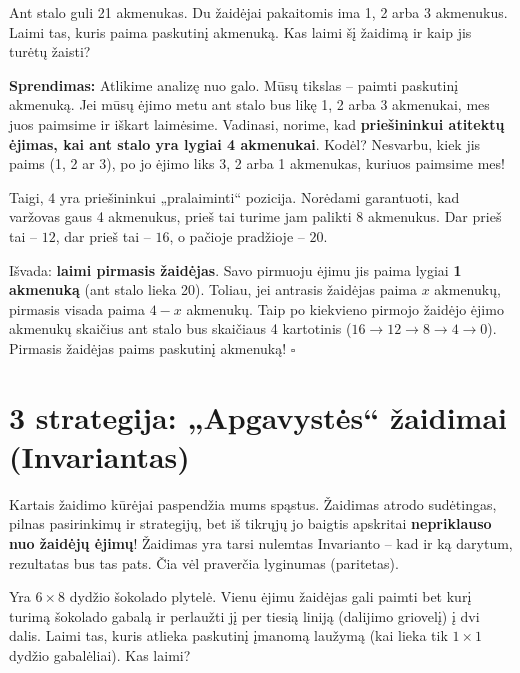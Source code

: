 \documentclass[11pt,a4paper]{scrartcl}
\newenvironment{solution}
    {\begin{list}{}{\setlength{\leftmargin}{10pt}\setlength{\rightmargin}{10pt}}\item[]}
    {\end{list}}
\begin{document}
\begin{example}[21 akmenukas]
Ant stalo guli 21 akmenukas. Du žaidėjai pakaitomis ima 1, 2 arba 3 akmenukus. Laimi tas, kuris paima paskutinį akmenuką. Kas laimi šį žaidimą ir kaip jis turėtų žaisti?
\end{example}

\begin{solution}
\textbf{Sprendimas:}
Atlikime analizę nuo galo. Mūsų tikslas – paimti paskutinį akmenuką.
Jei mūsų ėjimo metu ant stalo bus likę 1, 2 arba 3 akmenukai, mes juos paimsime ir iškart laimėsime. Vadinasi, norime, kad \textbf{priešininkui atitektų ėjimas, kai ant stalo yra lygiai 4 akmenukai}. Kodėl? Nesvarbu, kiek jis paims (1, 2 ar 3), po jo ėjimo liks 3, 2 arba 1 akmenukas, kuriuos paimsime mes!

Taigi, $4$ yra priešininkui „pralaiminti“ pozicija. 
Norėdami garantuoti, kad varžovas gaus 4 akmenukus, prieš tai turime jam palikti $8$ akmenukus. Dar prieš tai – $12$, dar prieš tai – $16$, o pačioje pradžioje – $20$.

Išvada: \textbf{laimi pirmasis žaidėjas}. 
Savo pirmuoju ėjimu jis paima lygiai \textbf{1 akmenuką} (ant stalo lieka 20). 
Toliau, jei antrasis žaidėjas paima $x$ akmenukų, pirmasis visada paima $4-x$ akmenukų. Taip po kiekvieno pirmojo žaidėjo ėjimo akmenukų skaičius ant stalo bus skaičiaus 4 kartotinis ($16 \to 12 \to 8 \to 4 \to 0$). Pirmasis žaidėjas paims paskutinį akmenuką! \hfill $\square$
\end{solution}

\section{3 strategija: „Apgavystės“ žaidimai (Invariantas)}

Kartais žaidimo kūrėjai paspendžia mums spąstus. Žaidimas atrodo sudėtingas, pilnas pasirinkimų ir strategijų, bet iš tikrųjų jo baigtis apskritai \textbf{nepriklauso nuo žaidėjų ėjimų}! Žaidimas yra tarsi nulemtas Invarianto – kad ir ką darytum, rezultatas bus tas pats. Čia vėl praverčia lyginumas (paritetas).

\begin{example}
Yra $6 \times 8$ dydžio šokolado plytelė. Vienu ėjimu žaidėjas gali paimti bet kurį turimą šokolado gabalą ir perlaužti jį per tiesią liniją (dalijimo griovelį) į dvi dalis. Laimi tas, kuris atlieka paskutinį įmanomą laužymą (kai lieka tik $1 \times 1$ dydžio gabalėliai). Kas laimi?
\end{example}
\end{document}
